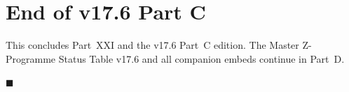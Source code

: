 \documentclass[12pt, a4paper]{article}
\begin{document}
\bigskip
%
%
%
%
%
%

\section*{End of v17.6 Part C}

This concludes Part~XXI and the v17.6 Part~C edition. The Master
Z-Programme Status Table v17.6 and all companion embeds continue
in Part~D.

\noindent\hfill$\blacksquare$
\end{document}
